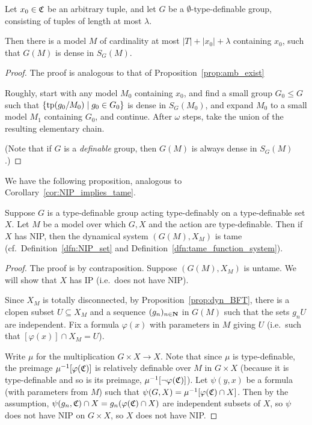 	\begin{prop}
		\label{prop:amb_for_groups}
		Let $x_0\in {\mathfrak C}$ be an arbitrary tuple, and let $G$ be a $\emptyset$-type-definable group, consisting of tuples of length at most $\lambda$.
		
		Then there is a model $M$ of cardinality at most $\lvert T\rvert+\lvert x_0\rvert+\lambda$ containing $x_0$, such that $G(M)$ is dense in $S_G(M)$.
	\end{prop}
	\begin{proof}
		The proof is analogous to that of Proposition~\ref{prop:amb_exist}
		
		Roughly, start with any model $M_0$ containing $x_0$, and find a small group $G_0\leq G$ such that $\{\operatorname{{tp}}(g_0/M_0)\mid g_0\in G_0 \}$ is dense in $S_G(M_0)$, and expand $M_0$ to a small model $M_1$ containing $G_0$, and continue. After $\omega$ steps, take the union of the resulting elementary chain.
		
		(Note that if $G$ is a \emph{definable} group, then $G(M)$ is always dense in $S_G(M)$.)
	\end{proof}
	
	We have the following proposition, analogous to Corollary~\ref{cor:NIP_implies_tame}.
	\begin{prop}
		\label{prop:nip_tame_group}
		Suppose $G$ is a type-definable group acting type-definably on a type-definable set $X$. Let $M$ be a model over which $G,X$ and the action are type-definable. Then if $X$ has NIP, then the dynamical system $(G(M),X_M)$ is tame (cf.\ Definition~\ref{dfn:NIP_set} and Definition~\ref{dfn:tame_function_system}).
	\end{prop}
	\begin{proof}
		The proof is by contraposition. Suppose $(G(M),X_M)$ is untame. We will show that $X$ has IP (i.e.\ does not have NIP).
		
		Since $X_M$ is totally disconnected, by Proposition~\ref{prop:dyn_BFT}, there is a clopen subset $U\subseteq X_M$ and a sequence $(g_n)_{n\in {\mathbf{N}}}$ in $G(M)$ such that the sets $g_nU$ are independent. Fix a formula $\varphi(x)$ with parameters in $M$ giving $U$ (i.e.\ such that $[\varphi(x)]\cap X_M=U$).
		
		Write $\mu$ for the multiplication $G\times X\to X$. Note that since $\mu$ is type-definable, the preimage $\mu^{-1}[\varphi({\mathfrak C})]$ is relatively definable over $M$ in $G\times X$ (because it is type-definable and so is its preimage, $\mu^{-1}[\neg \varphi({\mathfrak C})]$). Let $\psi(y,x)$ be a formula (with parameters from $M$) such that $\psi(G,X)=\mu^{-1}[\varphi({\mathfrak C})\cap X]$. Then by the assumption, $\psi(g_n,{\mathfrak C})\cap X=g_n(\varphi({\mathfrak C})\cap X)$ are independent subsets of $X$, so $\psi$ does not have NIP on $G\times X$, so $X$ does not have NIP.
	\end{proof}
	
